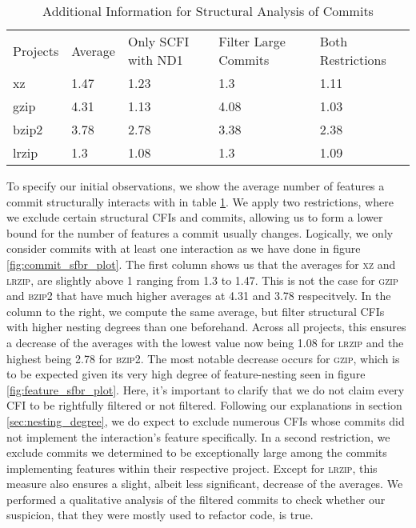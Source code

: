 \begin{table}[t]
\caption{Additional Information for Structural Analysis of Commits}
\label{tab:commit_sfbr_table}
\begin{tabular}{lllll}
 Projects & Average & Only SCFI with ND1 & Filter Large Commits & Both Restrictions \\
  xz    & 1.47 & 1.23 & 1.3  & 1.11 \\
  gzip  & 4.31 & 1.13 & 4.08 & 1.03 \\
  bzip2 & 3.78 & 2.78 & 3.38 & 2.38 \\
  lrzip & 1.3  & 1.08 & 1.3  & 1.09 \\
\end{tabular}
\end{table}

To specify our initial observations, we show the average number of features a commit structurally interacts with in table \ref{tab:commit_sfbr_table}.
We apply two restrictions, where we exclude certain structural CFIs and commits, allowing us to form a lower bound for the number of features a commit usually changes.
Logically, we only consider commits with at least one interaction as we have done in figure \ref{fig:commit_sfbr_plot}.
The first column shows us that the averages for \textsc{xz} and \textsc{lrzip}, are slightly above 1 ranging from 1.3 to 1.47.
This is not the case for \textsc{gzip} and \textsc{bzip2} that have much higher averages at 4.31 and 3.78 respecitvely.
In the column to the right, we compute the same average, but filter structural CFIs with higher nesting degrees than one beforehand.
Across all projects, this ensures a decrease of the averages with the lowest value now being 1.08 for \textsc{lrzip} and the highest being 2.78 for \textsc{bzip2}.
The most notable decrease occurs for \textsc{gzip}, which is to be expected given its very high degree of feature-nesting seen in figure \ref{fig:feature_sfbr_plot}.
Here, it's important to clarify that we do not claim every CFI to be rightfully filtered or not filtered.
Following our explanations in section \ref{sec:nesting_degree}, we do expect to exclude numerous CFIs whose commits did not implement the interaction's feature specifically.
In a second restriction, we exclude commits we determined to be exceptionally large among the commits implementing features within their respective project.
Except for \textsc{lrzip}, this measure also ensures a slight, albeit less significant, decrease of the averages. 
We performed a qualitative analysis of the filtered commits to check whether our suspicion, that they were mostly used to refactor code, is true.
